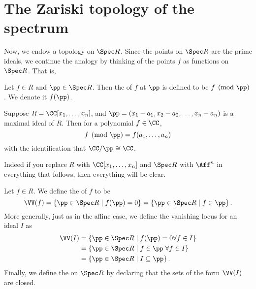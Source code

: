 \section{The Zariski topology of the spectrum}

Now, we endow a topology on $\Spec R$.
Since the points on $\Spec R$ are the prime ideals, we continue
the analogy by thinking of the points $f$ as functions on $\Spec R$. That is,
\begin{definition}
	Let $f \in R$ and $\pp \in \Spec R$.
	Then the  of $f$ at $\pp$ is defined to be $f \pmod{\pp}$.
	We denote it $f(\pp)$.
\end{definition}
\begin{example}
	Suppose $R = \CC[x_1, \dots, x_n]$,
	and $\pp = (x_1-a_1, x_2-a_2, \dots, x_n-a_n)$ is a maximal ideal of $R$.
	Then for a polynomial $f \in \CC$,
	\[ f \pmod \pp = f(a_1, \dots, a_n) \]
	with the identification that $\CC/\pp \cong \CC$.
\end{example}
Indeed if you replace $R$ with $\CC[x_1, \dots, x_n]$
and $\Spec R$ with $\Aff^n$ in everything that follows,
then everything will be clear.

\begin{definition}
	Let $f \in R$. We define the  of $f$ to be
	\[ \VV(f) = \left\{ \pp \in \Spec R \mid f(\pp) = 0 \right\}
		= \left\{ \pp \in \Spec R \mid f \in \pp \right\}. \]
	More generally, just as in the affine case,
	we define the vanishing locus for an ideal $I$ as
	\begin{align*}
		\VV(I) &= \left\{ \pp \in \Spec R \mid f(\pp)=0 \forall f \in I \right\} \\
		&= \left\{ \pp \in \Spec R \mid f \in \pp \; \forall f \in I \right\} \\
		&= \left\{ \pp \in \Spec R \mid I \subseteq \pp \right\}.
	\end{align*}
	Finally, we define the  on $\Spec R$
	by declaring that the sets of the form $\VV(I)$ are closed.
\end{definition}

